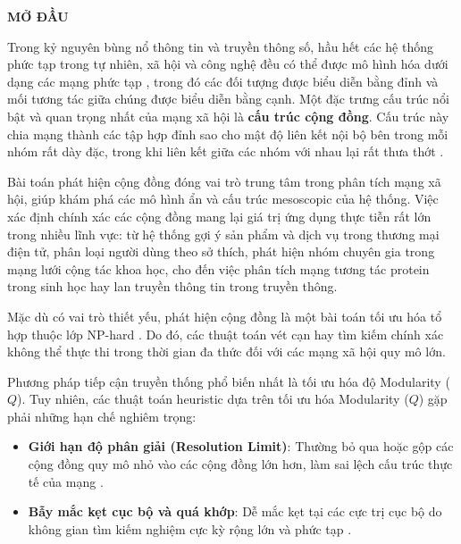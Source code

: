 \documentclass[14pt,a4paper]{extarticle}
\begin{document}
\makeatletter
\renewcommand\citepunct{], [}
\makeatother

\newpage %
\renewcommand{\contentsname}{
    \begin{center}
        \textbf{\fontsize{16pt}{17pt}\selectfont MỤC LỤC}
    \end{center}
}
\tableofcontents
\newpage

\begin{center}
\textbf{\fontsize{14}{21}\selectfont
MỞ ĐẦU}
\end{center}

Trong kỷ nguyên bùng nổ thông tin và truyền thông số, hầu hết các hệ thống phức tạp trong tự nhiên, xã hội và công nghệ đều có thể được mô hình hóa dưới dạng các mạng phức tạp \cite{Said2018}, trong đó các đối tượng được biểu diễn bằng đỉnh và mối tương tác giữa chúng được biểu diễn bằng cạnh. Một đặc trưng cấu trúc nổi bật và quan trọng nhất của mạng xã hội là \textbf{cấu trúc cộng đồng}. Cấu trúc này chia mạng thành các tập hợp đỉnh sao cho mật độ liên kết nội bộ bên trong mỗi nhóm rất dày đặc, trong khi liên kết giữa các nhóm với nhau lại rất thưa thớt \cite{Chen2019}.

Bài toán phát hiện cộng đồng đóng vai trò trung tâm trong phân tích mạng xã hội, giúp khám phá các mô hình ẩn và cấu trúc mesoscopic của hệ thống. Việc xác định chính xác các cộng đồng mang lại giá trị ứng dụng thực tiễn rất lớn trong nhiều lĩnh vực: từ hệ thống gợi ý sản phẩm và dịch vụ trong thương mại điện tử, phân loại người dùng theo sở thích, phát hiện nhóm chuyên gia trong mạng lưới cộng tác khoa học, cho đến việc phân tích mạng tương tác protein trong sinh học hay lan truyền thông tin trong truyền thông.

Mặc dù có vai trò thiết yếu, phát hiện cộng đồng là một bài toán tối ưu hóa tổ hợp thuộc lớp NP-hard \cite{Said2018}. Do đó, các thuật toán vét cạn hay tìm kiếm chính xác không thể thực thi trong thời gian đa thức đối với các mạng xã hội quy mô lớn.

Phương pháp tiếp cận truyền thống phổ biến nhất là tối ưu hóa độ Modularity ($Q$). Tuy nhiên, các thuật toán heuristic dựa trên tối ưu hóa Modularity ($Q$) gặp phải những hạn chế nghiêm trọng:

\begin{itemize}
    \item \textbf{Giới hạn độ phân giải (Resolution Limit)}: Thường bỏ qua hoặc gộp các cộng đồng quy mô nhỏ vào các cộng đồng lớn hơn, làm sai lệch cấu trúc thực tế của mạng \cite{Fortunato2010}.
    \item \textbf{Bẫy mắc kẹt cục bộ và quá khớp}: Dễ mắc kẹt tại các cực trị cục bộ do không gian tìm kiếm nghiệm cực kỳ rộng lớn và phức tạp \cite{Peixoto2023}.
\end{itemize}
\end{document}
